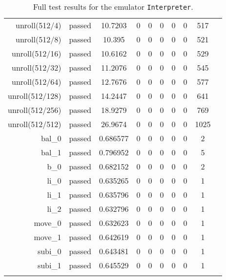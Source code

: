 \begin{longtable}{r|ccccccccc}
    unroll(512/4) & passed & 10.7203 & 0 & 0 & 0 & 0 & 0 & 517 \\
    unroll(512/8) & passed & 10.395 & 0 & 0 & 0 & 0 & 0 & 521 \\
    unroll(512/16) & passed & 10.6162 & 0 & 0 & 0 & 0 & 0 & 529 \\
    unroll(512/32) & passed & 11.2076 & 0 & 0 & 0 & 0 & 0 & 545 \\
    unroll(512/64) & passed & 12.7676 & 0 & 0 & 0 & 0 & 0 & 577 \\
    unroll(512/128) & passed & 14.2447 & 0 & 0 & 0 & 0 & 0 & 641 \\
    unroll(512/256) & passed & 18.9279 & 0 & 0 & 0 & 0 & 0 & 769 \\
    unroll(512/512) & passed & 26.9674 & 0 & 0 & 0 & 0 & 0 & 1025 \\
    bal\_0 & passed & 0.686577 & 0 & 0 & 0 & 0 & 0 & 2 \\
    bal\_1 & passed & 0.796952 & 0 & 0 & 0 & 0 & 0 & 5 \\
    b\_0 & passed & 0.682152 & 0 & 0 & 0 & 0 & 0 & 2 \\
    li\_0 & passed & 0.635265 & 0 & 0 & 0 & 0 & 0 & 1 \\
    li\_1 & passed & 0.635796 & 0 & 0 & 0 & 0 & 0 & 1 \\
    li\_2 & passed & 0.632796 & 0 & 0 & 0 & 0 & 0 & 1 \\
    move\_0 & passed & 0.632623 & 0 & 0 & 0 & 0 & 0 & 1 \\
    move\_1 & passed & 0.642619 & 0 & 0 & 0 & 0 & 0 & 1 \\
    subi\_0 & passed & 0.643481 & 0 & 0 & 0 & 0 & 0 & 1 \\
    subi\_1 & passed & 0.645529 & 0 & 0 & 0 & 0 & 0 & 1 \\

    \bottomrule
    \caption{Full test results for the emulator \texttt{Interpreter}.}
    \label{tbl:full-test-output-interpreter}
\end{longtable}

